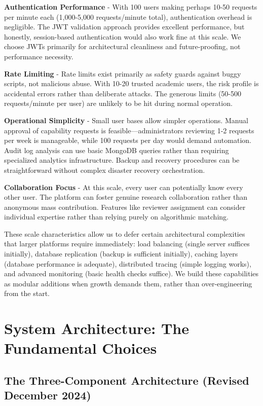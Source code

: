 \documentclass[12pt,a4paper]{article}
\begin{document}
\textbf{Authentication Performance} - With 100 users making perhaps 10-50 requests per minute each (1,000-5,000 requests/minute total), authentication overhead is negligible. The JWT validation approach provides excellent performance, but honestly, session-based authentication would also work fine at this scale. We choose JWTs primarily for architectural cleanliness and future-proofing, not performance necessity.

\textbf{Rate Limiting} - Rate limits exist primarily as safety guards against buggy scripts, not malicious abuse. With 10-20 trusted academic users, the risk profile is accidental errors rather than deliberate attacks. The generous limits (50-500 requests/minute per user) are unlikely to be hit during normal operation.

\textbf{Operational Simplicity} - Small user bases allow simpler operations. Manual approval of capability requests is feasible—administrators reviewing 1-2 requests per week is manageable, while 100 requests per day would demand automation. Audit log analysis can use basic MongoDB queries rather than requiring specialized analytics infrastructure. Backup and recovery procedures can be straightforward without complex disaster recovery orchestration.

\textbf{Collaboration Focus} - At this scale, every user can potentially know every other user. The platform can foster genuine research collaboration rather than anonymous mass contribution. Features like reviewer assignment can consider individual expertise rather than relying purely on algorithmic matching.

These scale characteristics allow us to defer certain architectural complexities that larger platforms require immediately: load balancing (single server suffices initially), database replication (backup is sufficient initially), caching layers (database performance is adequate), distributed tracing (simple logging works), and advanced monitoring (basic health checks suffice). We build these capabilities as modular additions when growth demands them, rather than over-engineering from the start.

\section{System Architecture: The Fundamental Choices}

\subsection{The Three-Component Architecture (Revised December 2024)}
\end{document}

